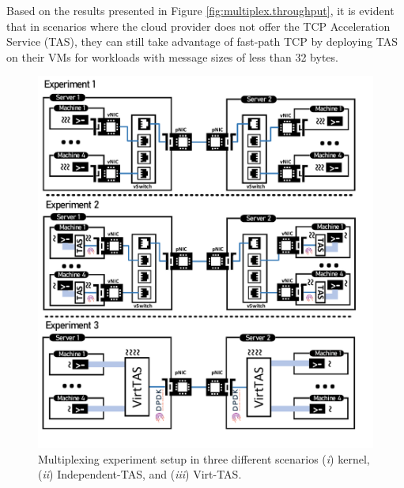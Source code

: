Based on the results presented in Figure \ref{fig:multiplex.throughput}, it is 
evident that in scenarios where the cloud provider does not offer the TCP Acceleration 
Service (TAS), they can still take advantage of fast-path TCP by deploying TAS on their 
VMs for workloads with message sizes of less than 32 bytes.

\begin{figure}
    \centering
    \includegraphics[scale=0.6]{../Figures/multiplexing.experiment.pdf}
    \caption{Multiplexing experiment setup in three different scenarios (\emph{i}) kernel, 
    (\emph{ii}) Independent-TAS, and (\emph{iii}) Virt-TAS.}
    \label{fig:multiplexing.experiment}
\end{figure}

